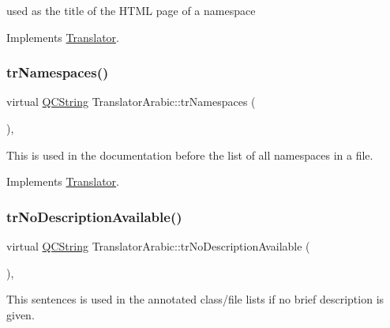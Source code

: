 used as the title of the H\+T\+ML page of a namespace 

Implements \mbox{\hyperlink{class_translator}{Translator}}.

\mbox{\label{class_translator_arabic_a3b13e16742b3abf9aaec6c0a3911da95}} 
\subsubsection{\texorpdfstring{trNamespaces()}{trNamespaces()}}
{\footnotesize\ttfamily virtual \mbox{\hyperlink{class_q_c_string}{Q\+C\+String}} Translator\+Arabic\+::tr\+Namespaces (\begin{DoxyParamCaption}{ }\end{DoxyParamCaption})\hspace{0.3cm}{\ttfamily [inline]}, {\ttfamily [virtual]}}

This is used in the documentation before the list of all namespaces in a file. 

Implements \mbox{\hyperlink{class_translator}{Translator}}.

\mbox{\label{class_translator_arabic_a533c780424da89c73dbd2b44da8e61e0}} 
\subsubsection{\texorpdfstring{trNoDescriptionAvailable()}{trNoDescriptionAvailable()}}
{\footnotesize\ttfamily virtual \mbox{\hyperlink{class_q_c_string}{Q\+C\+String}} Translator\+Arabic\+::tr\+No\+Description\+Available (\begin{DoxyParamCaption}{ }\end{DoxyParamCaption})\hspace{0.3cm}{\ttfamily [inline]}, {\ttfamily [virtual]}}

This sentences is used in the annotated class/file lists if no brief description is given. \mbox{\label{class_translator_arabic_ad54045b56a939c9ed9fb492335907cfd}} 
